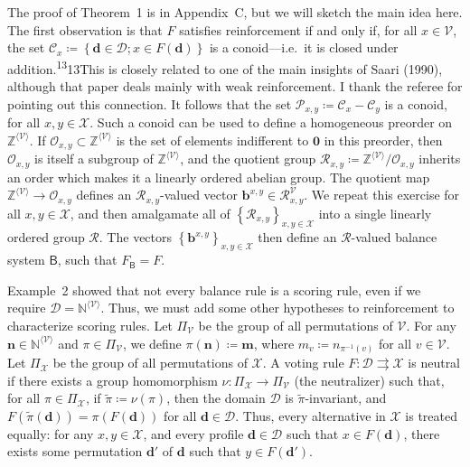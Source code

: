 \documentclass[
]{article}
\begin{document}
The proof of Theorem~1 is in Appendix~C, but we will sketch the main
idea here. The first observation is that \(F\) satisfies reinforcement
if and only if, for all \(x \in \mathcal{V}\), the set
\(\mathcal{C}_{x} ≔ \left\{ \mathbf{d} \in \mathcal{D};x \in F\left( \mathbf{d} \right) \right\}\)
is a conoid---i.e.~it is closed under
addition.\textsuperscript{13}13This is closely related to one of the
main insights of Saari (1990), although that paper deals mainly with
weak reinforcement. I thank the referee for pointing out this
connection. It follows that the set
\(\mathcal{P}_{x,y} ≔ \mathcal{C}_{x} - \mathcal{C}_{y}\) is a conoid,
for all \(x,y \in \mathcal{X}\). Such a conoid can be used to define a
homogeneous preorder on \(\mathbb{Z}^{\langle\mathcal{V}\rangle}\). If
\(\mathcal{O}_{x,y} \subset \mathbb{Z}^{\langle\mathcal{V}\rangle}\) is
the set of elements indifferent to \(\mathbf{0}\) in this preorder, then
\(\mathcal{O}_{x,y}\) is itself a subgroup of
\(\mathbb{Z}^{\langle\mathcal{V}\rangle}\), and the quotient group
\(\mathcal{R}_{x,y} ≔ \mathbb{Z}^{\langle\mathcal{V}\rangle}/\mathcal{O}_{x,y}\)
inherits an order which makes it a linearly ordered abelian group. The
quotient map
\(\left. \mathbb{Z}^{\langle\mathcal{V}\rangle}\longrightarrow\mathcal{O}_{x,y} \right.\)
defines an \(\mathcal{R}_{x,y}\)-valued vector
\(\mathbf{b}^{x,y} \in \mathcal{R}_{x,y}^{\mathcal{V}}\). We repeat this
exercise for all \(x,y \in \mathcal{X}\), and then amalgamate all of
\(\left\{ \mathcal{R}_{x,y} \right\}_{x,y \in \mathcal{X}}\) into a
single linearly ordered group \(\mathcal{R}\). The vectors
\(\left\{ \mathbf{b}^{x,y} \right\}_{x,y \in \mathcal{X}}\) then define
an \(\mathcal{R}\)-valued balance system \(\mathsf{B}\), such that
\(F_{\mathsf{B}} = F\).

Example~2 showed that not every balance rule is a scoring rule, even if
we require \(\mathcal{D} = \mathbb{N}^{\langle\mathcal{V}\rangle}\).
Thus, we must add some other hypotheses to reinforcement to characterize
scoring rules. Let \(\Pi_{\mathcal{V}}\) be the group of all
permutations of \(\mathcal{V}\). For any
\(\mathbf{n} \in \mathbb{N}^{\langle\mathcal{V}\rangle}\) and
\(\pi \in \Pi_{\mathcal{V}}\), we define
\(\pi\left( \mathbf{n} \right) ≔ \mathbf{m}\), where
\(m_{v} ≔ n_{\pi^{- 1}{(v)}}\) for all \(v \in \mathcal{V}\). Let
\(\Pi_{\mathcal{X}}\) be the group of all permutations of
\(\mathcal{X}\). A voting rule
\(\left. F:\mathcal{D}\rightrightarrows\mathcal{X} \right.\) is neutral
if there exists a group homomorphism
\(\left. \nu:\Pi_{\mathcal{X}}\longrightarrow\Pi_{\mathcal{V}} \right.\)
(the neutralizer) such that, for all \(\pi \in \Pi_{\mathcal{X}}\), if
\(\widetilde{\pi} ≔ \nu(\pi)\), then the domain \(\mathcal{D}\) is
\(\widetilde{\pi}\)-invariant, and
\(F\left( \widetilde{\pi}\left( \mathbf{d} \right) \right) = \pi\left( F\left( \mathbf{d} \right) \right)\)
for all \(\mathbf{d} \in \mathcal{D}\). Thus, every alternative in
\(\mathcal{X}\) is treated equally: for any \(x,y \in \mathcal{X}\), and
every profile \(\mathbf{d} \in \mathcal{D}\) such that
\(x \in F\left( \mathbf{d} \right)\), there exists some permutation
\(\mathbf{d}'\) of \(\mathbf{d}\) such that
\(y \in F\left( \mathbf{d}' \right)\).
\end{document}
